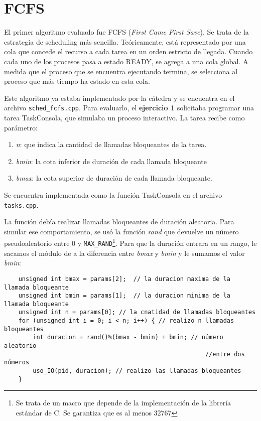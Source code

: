 \section{FCFS}

El primer algoritmo evaluado fue FCFS (\textit{First Came First Save}). Se trata de la estrategia de scheduling m\'as sencilla. Te\'oricamente, est\'a representado por una cola que concede el recurso a cada tarea en un orden estricto de llegada. Cuando cada uno de los procesos pasa a estado READY, se agrega a una cola global. A medida que el proceso que se encuentra ejecutando termina, se selecciona al proceso que m\'as tiempo ha estado en esta cola.

Este algoritmo ya estaba implementado por la c\'atedra y se encuentra en el archivo \verb+sched_fcfs.cpp+. Para evaluarlo, el \textbf{ejercicio 1} solicitaba programar una tarea TaskConsola, que simulaba un proceso interactivo. La tarea recibe como par\'ametro:

\begin{enumerate}
	\item \textit{n}: que indica la cantidad de llamadas bloqueantes de la tarea.
	
	\item \textit{bmin}: la cota inferior de duraci\'on de cada llamada bloqueante
	
	\item \textit{bmax}: la cota superior de duraci\'on de cada llamada bloqueante.
\end{enumerate}

Se encuentra implementada como la funci\'on TaskConsola en el archivo \verb+tasks.cpp+.

La funci\'on deb\'ia realizar llamadas bloqueantes de duraci\'on aleatoria. Para simular ese comportamiento, se us\'o la funci\'on \textit{rand} que devuelve un n\'umero pseudoaleatorio entre 0 y \verb+MAX_RAND+\footnote{Se trata de un macro que depende de la implementaci\'on de la librer\'ia est\'andar de C. Se garantiza que es al menos 32767}. Para que la duraci\'on entrara en un rango, le sacamos el m\'odulo de a la diferencia entre \textit{bmax} y \textit{bmin} y le sumamos el valor \textit{bmin}:

\begin{verbatim}
    unsigned int bmax = params[2];	// la duracion maxima de la llamada bloqueante
    unsigned int bmin = params[1];  // la duracion minima de la llamada bloqueante
    unsigned int n = params[0];	// la cnatidad de llamadas bloqueantes
    for (unsigned int i = 0; i < n; i++) { // realizo n llamadas bloqueantes
        int duracion = rand()%(bmax - bmin) + bmin;	// número aleatorio 
        												//entre dos números
        uso_IO(pid, duracion); // realizo las llamadas bloqueantes
    }
\end{verbatim}

